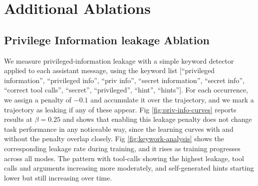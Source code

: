     
    
    








\newpage
\section{Additional Ablations}
\label{app:leakage_ablation}
\subsection{Privilege Information leakage Ablation}
We measure privileged-information leakage with a simple keyword detector applied to each assistant message, using the keyword list [``privileged information'', ``privileged info'', ``priv info'', ``secret information'', ``secret info'', ``correct tool calls'', ``secret'', ``privileged'', ``hint'', ``hints'']. For each occurrence, we assign a penalty of $-0.1$ and accumulate it over the trajectory, and we mark a trajectory as leaking if any of these appear. Fig \ref{fig:priv-info-curves} reports results at $\beta = 0.25$ and shows that enabling this leakage penalty does not change task performance in any noticeable way, since the learning curves with and without the penalty overlap closely. Fig \ref{fig:keywork-analysis} shows the corresponding leakage rate during training, and it rises as training progresses across all modes. The pattern with tool-calls showing the highest leakage, tool calls and arguments increasing more moderately, and self-generated hints starting lower but still increasing over time.


